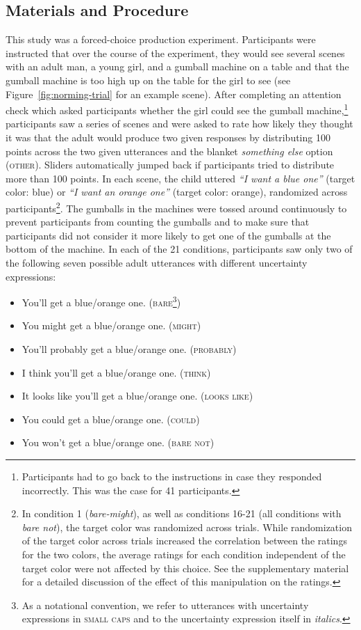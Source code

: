 \documentclass[man, floatsintext]{apa6}
\begin{document}
\subsection{Materials and Procedure}
This study was a forced-choice production experiment. Participants were instructed 
that over the course of the experiment, they would see several scenes with an adult man, 
a young girl, and a gumball machine on a table and 
that the gumball machine is too high up on the table for the girl to see (see Figure~\ref{fig:norming-trial} for an example scene). 
After completing an attention check which asked participants whether 
the girl could see the gumball machine,\footnote{Participants had to go back to the instructions in case they responded incorrectly. This was the case for 41 participants.} 
participants saw a series of scenes  and were asked to rate how likely they thought it was that the 
adult would produce two given responses by distributing 100 points across the two given utterances and the 
blanket \textit{something else} option (\textsc{other}). Sliders automatically jumped back if participants tried to distribute more than 100 points. 
In each scene, the child uttered \textit{``I want a blue one''} (target color: blue) or  \textit{``I want an orange one''} (target color: orange), randomized across participants\footnote{In condition 1 (\textit{bare-might}), as well as conditions 16-21 (all conditions with \textit{bare not}), the target color was randomized across trials. While randomization of the target color across trials increased the correlation between the ratings for the two colors,  the average ratings for each condition independent of the target color were not affected by this choice. See the supplementary material for a detailed discussion of the effect of this manipulation on the ratings.}. The gumballs in the machines were tossed around continuously to prevent participants from counting the gumballs
and to make sure that participants did not consider it more likely to get one of the gumballs at the bottom of the machine.
 In each of the 21 conditions, participants saw only  two of the following seven possible adult utterances with different uncertainty expressions:

 \begin{itemize}
\item You'll get a blue/orange one. (\textsc{bare}\footnote{As a notational convention, we refer to utterances with uncertainty expressions in \textsc{small caps} and to the uncertainty expression itself in \textit{italics}. })
\item You might get a blue/orange one. (\textsc{might})
\item You'll probably get a blue/orange one. (\textsc{probably})
\item I think you'll get a blue/orange one. (\textsc{think})
\item It looks like you'll get a blue/orange one. (\textsc{looks like})
\item You could get a blue/orange one. (\textsc{could})
\item You won't get a blue/orange one. (\textsc{bare not})
\end{itemize}
\end{document}
